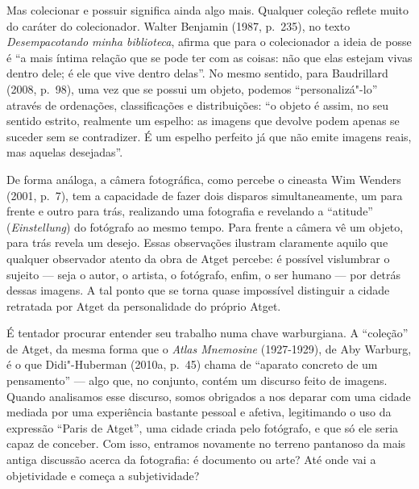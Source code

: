 Mas colecionar e possuir significa ainda algo mais. Qualquer coleção
reflete muito do caráter do colecionador. Walter Benjamin (1987, p.~235), no texto \emph{Desempacotando minha biblioteca}, afirma que para o
colecionador a ideia de posse é ``a mais íntima relação que se pode ter
com as coisas: não que elas estejam vivas dentro dele; é ele que vive
dentro delas''. No mesmo sentido, para Baudrillard (2008, p.~98), uma
vez que se possui um objeto, podemos ``personalizá"-lo'' através de
ordenações, classificações e distribuições: ``o objeto é assim, no seu
sentido estrito, realmente um espelho: as imagens que devolve podem
apenas se suceder sem se contradizer. É um espelho perfeito já que não
emite imagens reais, mas aquelas desejadas''.

De forma análoga, a câmera fotográfica, como
percebe o cineasta Wim Wenders (2001, p.~7), tem a capacidade de fazer dois
disparos simultaneamente, um para frente e outro para trás, realizando
uma fotografia e revelando a ``atitude'' (\emph{Einstellung}) do
fotógrafo ao mesmo tempo. Para frente a câmera vê um objeto, para trás
revela um desejo. Essas observações ilustram claramente aquilo que
qualquer observador atento da obra de Atget percebe: é possível
vislumbrar o sujeito --- seja o autor, o artista, o fotógrafo, enfim, o
ser humano --- por detrás dessas imagens. A tal ponto que se torna quase
impossível distinguir a cidade retratada por Atget da personalidade do
próprio Atget.

É tentador procurar entender seu trabalho numa chave warburgiana. A
``coleção'' de Atget, da mesma forma que o \emph{Atlas Mnemosine}
(1927-1929), de Aby Warburg, é o que Didi"-Huberman (2010a, p.~45) chama
de ``aparato concreto de um pensamento'' --- algo que, no conjunto,
contém um discurso feito de imagens. Quando analisamos esse discurso,
somos obrigados a nos deparar com uma cidade mediada por uma experiência
bastante pessoal e afetiva, legitimando o uso da expressão ``Paris de
Atget'', uma cidade criada pelo fotógrafo, e que só ele seria capaz de
conceber. Com isso, entramos novamente no terreno pantanoso da mais
antiga discussão acerca da fotografia: é documento ou arte? Até onde vai
a objetividade e começa a subjetividade?

